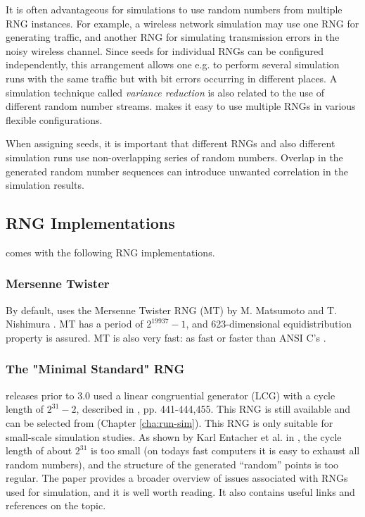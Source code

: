 It is often advantageous for simulations to use random numbers from
multiple RNG instances. For example, a wireless network simulation may use
one RNG for generating traffic, and another RNG for simulating transmission
errors in the noisy wireless channel. Since seeds for individual RNGs can
be configured independently, this arrangement allows one e.g. to perform
several simulation runs with the same traffic but with bit errors occurring
in different places. A simulation technique called \textit{variance
reduction} is also related to the use of different random number streams.
{\opp} makes it easy to use multiple RNGs in various flexible configurations.

When assigning seeds, it is important that different RNGs and also
different simulation runs use non-overlapping series of random numbers.
Overlap in the generated random number sequences can introduce unwanted
correlation in the simulation results.

\subsection{RNG Implementations}
\label{sec:sim-lib:rngs}

{\opp} comes with the following RNG implementations.

\subsubsection{Mersenne Twister}

By default, {\opp} uses the Mersenne Twister RNG (MT) by M. Matsumoto and
T. Nishimura \cite{Matsumoto98}. MT has a period of $2^{19937}-1$,
and 623-dimensional equidistribution property is assured. MT is
also very fast: as fast or faster than ANSI C's .

\subsubsection{The "Minimal Standard" RNG}

{\opp} releases prior to 3.0 used a linear congruential generator
(LCG) with a cycle length of $2^{31}-2$, described in
\cite{Jain91}, pp. 441-444,455. This RNG is still available
and can be selected from  (Chapter \ref{cha:run-sim}).
This RNG is only suitable for small-scale simulation studies.
As shown by Karl Entacher et al. in \cite{Entacher02},
the cycle length of about $2^{31}$ is too small (on todays
fast computers it is easy to exhaust all random numbers), and
the structure of the generated ``random'' points is too regular.
The \cite{Hellekalek98} paper provides a broader overview of issues
associated with RNGs used for simulation, and it is well worth reading.
It also contains useful links and references on the topic.

